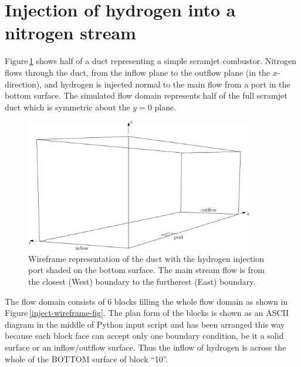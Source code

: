 \section{Injection of hydrogen into a nitrogen stream}
\label{inject-sec}
%
Figure\,\ref{inject-schematic-fig} shows half of a duct representing
a simple scramjet combustor. 
Nitrogen flows through the duct, from the inflow plane to the outflow plane
(in the $x$-direction), and hydrogen is injected normal to the main flow from
a port in the bottom surface.
The simulated flow domain represents half of the full scramjet duct which is
symmetric about the $y = 0$ plane.

\begin{figure}[htbp]
\begin{center}
\includegraphics[width=10cm]{../3D/inject-1/inject-schematic.pdf}
\end{center}
\caption{Wireframe representation of the duct with the hydrogen injection port
  shaded on the bottom surface.
  The main stream flow is from the closest (West) boundary to the furtherest
  (East) boundary. }
\label{inject-schematic-fig}
\end{figure}

\medskip
The flow domain consists of 6 blocks filling the whole flow domain as shown in
Figure\,\ref{inject-wireframe-fig}. 
The plan form of the blocks is shown as an ASCII diagram in the middle of
Python input script and has been arranged this way because each block face can
accept only one boundary condition, be it a solid surface or an inflow/outflow
surface.
Thus the inflow of hydrogen is across the whole of the BOTTOM surface of block ``10''.


